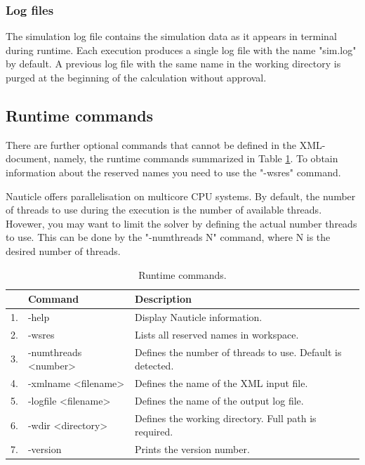 \documentclass[a4paper,12pt,openany]{book}
\theoremstyle{break}
\begin{document}
\subsubsection{Log files}
The simulation log file contains the simulation data as it appears in terminal during runtime. Each execution produces a single log file with the name "sim.log" by default. A previous log file with the same name in the working directory is purged at the beginning of the calculation without approval.
\subsection{Runtime commands}
There are further optional commands that cannot be defined in the XML-document, namely, the runtime commands summarized in Table \ref{tbl:runtime_commands}. To obtain information about the reserved names you need to use the "-wsres" command.

Nauticle offers parallelisation on multicore CPU systems. By default, the number of threads to use during the execution is the number of available threads. Hovewer, you may want to limit the solver by defining the actual number threads to use. This can be done by the "-numthreads N" command, where N is the desired number of threads. 
\begin{table} [h]
\begin{center}
\caption{Runtime commands.} \label{tbl:runtime_commands}
\begin{tabular}{ l l l }
\toprule[1.5pt]
\bf  & \bf Command & \bf Description\\
\midrule
1. & -help & Display Nauticle information. \\
2. & -wsres & Lists all reserved names in workspace. \\
3. & -numthreads <number> & Defines the number of threads to use. Default is detected. \\
4. & -xmlname <filename> & Defines the name of the XML input file. \\
5. & -logfile <filename> & Defines the name of the output log file. \\
6. & -wdir <directory> & Defines the working directory. Full path is required. \\
7. & -version & Prints the version number. \\
\bottomrule[1.25pt]
\end{tabular}
\end{center}
\end{table}
\end{document}
